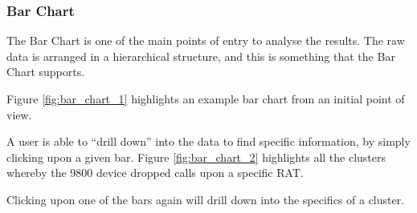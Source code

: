 \subsubsection{Bar Chart}
The Bar Chart is one of the main points of entry to analyse the results. The 
raw data is arranged in a hierarchical structure, and this is something that 
the Bar Chart supports.

Figure \ref{fig:bar_chart_1} highlights an example bar chart from an initial 
point of view.

A user is able to ``drill down'' into the data to find specific information, by
simply clicking upon a given bar. Figure \ref{fig:bar_chart_2} highlights all 
the clusters whereby the 9800 device dropped calls upon a specific RAT. 

Clicking upon one of the bars again will drill down into the specifics of a 
cluster.



